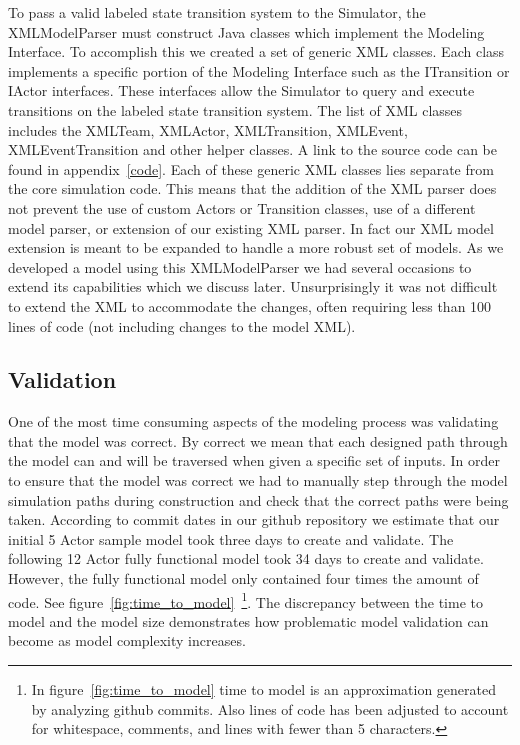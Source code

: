 To pass a valid labeled state transition system to the Simulator, the XMLModelParser must construct Java classes which implement the Modeling Interface.  To accomplish this we created a set of generic XML classes.  Each class implements a specific portion of the Modeling Interface such as the ITransition or IActor interfaces.  These interfaces allow the Simulator to query and execute transitions on the labeled state transition system.  The list of XML classes includes the XMLTeam, XMLActor, XMLTransition, XMLEvent, XMLEventTransition and other helper classes.  A link to the source code can be found in appendix~\ref{code}.  Each of these generic XML classes lies separate from the core simulation code.  This means that the addition of the XML parser does not prevent the use of custom Actors or Transition classes, use of a different model parser, or extension of our existing XML parser.  In fact our XML model extension is meant to be expanded to handle a more robust set of models.   As we developed a model using this XMLModelParser we had several occasions to extend its capabilities which we discuss later.  Unsurprisingly it was not difficult to extend the XML to accommodate the changes, often requiring less than 100 lines of code (not including changes to the model XML).

\subsection{Validation}

One of the most time consuming aspects of the modeling process was validating that the model was correct.  By correct we mean that each designed path through the model can and will be traversed when given a specific set of inputs.  In order to ensure that the model was correct we had to manually step through the model simulation paths during construction and check that the correct paths were being taken.  According to commit dates in our github repository we estimate that our initial 5 Actor sample model took three days to create and validate.  The following 12 Actor fully functional model took 34 days to create and validate.  However, the fully functional model only contained four times the amount of code.  See figure~\ref{fig:time_to_model}~\footnote{In figure~\ref{fig:time_to_model} time to model is an approximation generated by analyzing github commits.  Also lines of code has been adjusted to account for whitespace, comments, and lines with fewer than 5 characters.}.  The discrepancy between the time to model and the model size demonstrates how problematic model validation can become as model complexity increases.

